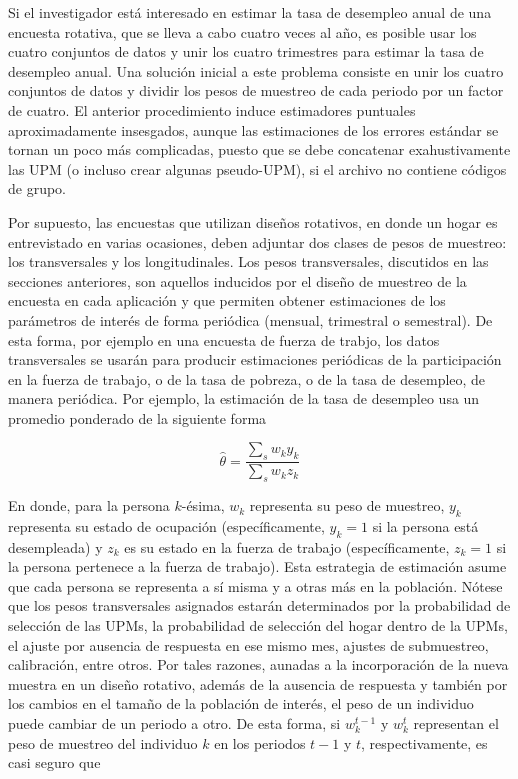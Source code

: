\documentclass[12pt,spanish,]{book}
\begin{document}
Si el investigador está interesado en estimar la tasa de desempleo anual de una encuesta rotativa, que se lleva a cabo cuatro veces al año, es posible usar los cuatro conjuntos de datos y unir los cuatro trimestres para estimar la tasa de desempleo anual. Una solución inicial a este problema consiste en unir los cuatro conjuntos de datos y dividir los pesos de muestreo de cada periodo por un factor de cuatro. El anterior procedimiento induce estimadores puntuales aproximadamente insesgados, aunque las estimaciones de los errores estándar se tornan un poco más complicadas, puesto que se debe concatenar exahustivamente las UPM (o incluso crear algunas pseudo-UPM), si el archivo no contiene códigos de grupo.

Por supuesto, las encuestas que utilizan diseños rotativos, en donde un hogar es entrevistado en varias ocasiones, deben adjuntar dos clases de pesos de muestreo: los transversales y los longitudinales. Los pesos transversales, discutidos en las secciones anteriores, son aquellos inducidos por el diseño de muestreo de la encuesta en cada aplicación y que permiten obtener estimaciones de los parámetros de interés de forma periódica (mensual, trimestral o semestral). De esta forma, por ejemplo en una encuesta de fuerza de trabjo, los datos transversales se usarán para producir estimaciones periódicas de la participación en la fuerza de trabajo, o de la tasa de pobreza, o de la tasa de desempleo, de manera periódica. Por ejemplo, la estimación de la tasa de desempleo usa un promedio ponderado de la siguiente forma

\[\hat\theta=\frac{\sum_s w_ky_k}{\sum_s w_kz_k}\]

En donde, para la persona \(k\)-ésima, \(w_k\) representa su peso de muestreo, \(y_k\) representa su estado de ocupación (específicamente, \(y_k=1\) si la persona está desempleada) y \(z_k\) es su estado en la fuerza de trabajo (específicamente, \(z_k=1\) si la persona pertenece a la fuerza de trabajo). Esta estrategia de estimación asume que cada persona se representa a sí misma y a otras más en la población. Nótese que los pesos transversales asignados estarán determinados por la probabilidad de selección de las UPMs, la probabilidad de selección del hogar dentro de la UPMs, el ajuste por ausencia de respuesta en ese mismo mes, ajustes de submuestreo, calibración, entre otros. Por tales razones, aunadas a la incorporación de la nueva muestra en un diseño rotativo, además de la ausencia de respuesta y también por los cambios en el tamaño de la población de interés, el peso de un individuo puede cambiar de un periodo a otro. De esta forma, si \(w_k^{t-1}\) y \(w_k^{t}\) representan el peso de muestreo del individuo \(k\) en los periodos \(t-1\) y \(t\), respectivamente, es casi seguro que
\end{document}

